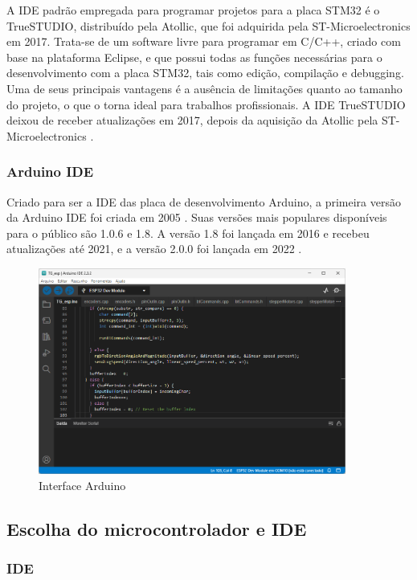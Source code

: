 A IDE padrão empregada para programar projetos para a placa STM32 é o TrueSTUDIO,
distribuído pela Atollic, que foi adquirida pela ST-Microelectronics em 2017.
Trata-se de um software livre para programar em C/C++, criado com base na
plataforma Eclipse, e que possui todas as funções necessárias para o
desenvolvimento com a placa STM32, tais como edição, compilação e debugging.
Uma de seus principais vantagens é a ausência de limitações quanto ao tamanho
do projeto, o que o torna ideal para trabalhos profissionais. A IDE TrueSTUDIO
deixou de receber atualizações em 2017, depois da aquisição da Atollic pela 
ST-Microelectronics \cite{apostila_microprossados}.


\subsubsection{Arduino IDE}

Criado para ser a IDE das placa de desenvolvimento Arduino, a primeira
versão da Arduino IDE foi criada em 2005 \cite{arduino_id_history}.
Suas versões mais populares disponíveis para o público são 1.0.6 e 1.8. 
A versão 1.8 foi lançada em 2016 e recebeu atualizações até 2021, 
e a versão 2.0.0 foi lançada em 2022 \cite{arduino_tag_2}.

\begin{figure}[ht]
	\centering
	\caption{Interface Arduino}
	\includegraphics[width=0.9\textwidth]{figures/arduino}
\end{figure}

\subsection{Escolha do microcontrolador e IDE}

\subsubsection{IDE}


